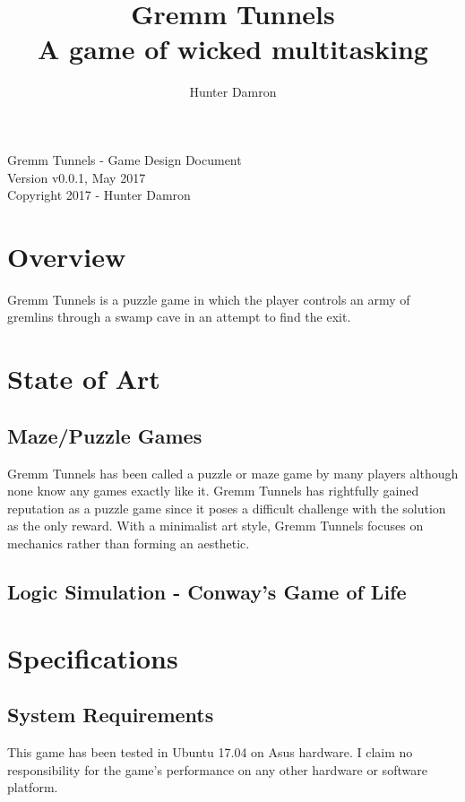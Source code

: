 \documentclass{scrreprt}
\title{
	Gremm Tunnels \\
    \large A game of wicked multitasking
}
\author{Hunter Damron}
\begin{document}
	\maketitle
	
	\null\vfill
	\noindent
	Gremm Tunnels - Game Design Document \\
	Version v0.0.1, May 2017 \\
	Copyright 2017 - Hunter Damron \\
	\newpage

	\tableofcontents
	\newpage
	
	\chapter{Overview}
		Gremm Tunnels is a puzzle game in which the player controls an army of gremlins through a swamp cave in an attempt to find the exit.
	
	\chapter{State of Art}
		
		\section{Maze/Puzzle Games}
			Gremm Tunnels has been called a puzzle or maze game by many players although none know any games exactly like it. Gremm Tunnels has rightfully gained reputation as a puzzle game since it poses a difficult challenge with the solution as the only reward. With a minimalist art style, Gremm Tunnels focuses on mechanics rather than forming an aesthetic.
			
		\section{Logic Simulation - Conway's Game of Life}
	
	\chapter{Specifications}
		\section{System Requirements}
			This game has been tested in Ubuntu 17.04 on Asus hardware. I claim no responsibility for the game's performance on any other hardware or software platform.
		
\end{document}
